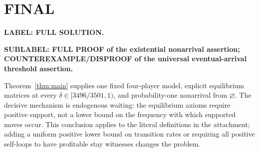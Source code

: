 \documentclass[11pt,a4paper]{article}
\theoremstyle{definition}\newtheorem{definition}[theorem]{Definition}
\theoremstyle{remark}\newtheorem{remark}[theorem]{Remark}
\newcommand{\1}{\mathbf 1}
\begin{document}
\section{FINAL}
\textbf{LABEL: FULL SOLUTION.}

\textbf{SUBLABEL: FULL PROOF of the existential nonarrival assertion; COUNTEREXAMPLE/DISPROOF of the universal eventual-arrival threshold assertion.}

Theorem~\ref{thm:main} supplies one fixed four-player model, explicit equilibrium matrices at every $\delta\in[3496/3501,1)$, and probability-one nonarrival from $\varnothing$. The decisive mechanism is endogenous waiting: the equilibrium axioms require positive support, not a lower bound on the frequency with which supported moves occur. This conclusion applies to the literal definitions in the attachment; adding a uniform positive lower bound on transition rates or requiring all positive self-loops to have profitable stay witnesses changes the problem.
\end{document}
